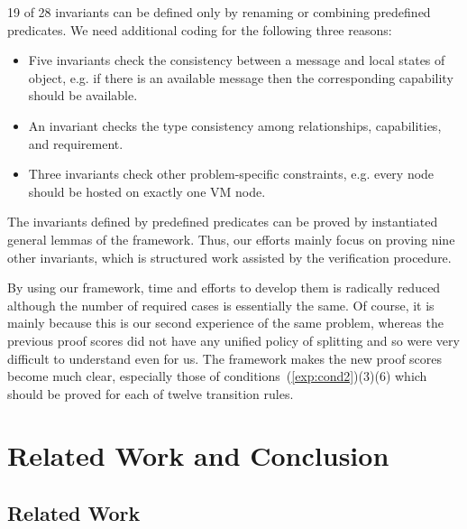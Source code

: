 \documentclass[12pt]{report}
\begin{document}
19 of 28 invariants can be defined only by renaming or combining
predefined predicates. We need additional coding for the following
three reasons:
\begin{itemize}
\item Five invariants check the consistency between a message and local
states of object, e.g. if there is an available message then the
corresponding capability should be available.
\item An invariant checks the type consistency among relationships,
  capabilities, and requirement.
\item Three invariants check other problem-specific constraints, e.g.
  every node should be hosted on exactly one VM node.
\end{itemize}

The invariants defined by predefined predicates can be proved by
instantiated general lemmas of the framework. Thus, our efforts mainly
focus on proving nine other invariants, which is structured work
assisted by the verification procedure.

By using our framework, time and efforts to develop them is radically
reduced although the number of required cases is essentially the same.
Of course, it is mainly because this is our second experience of the
same problem, whereas the previous proof scores did not have any
unified policy of splitting and so were very difficult to understand
even for us. The framework makes the new proof scores become much
clear, especially those of conditions~(\ref{exp:cond2})(3)(6) which should be proved
for each of twelve transition rules.


\chapter{Related Work and Conclusion}
\label{chap:conclusion}
\section{Related Work}
\end{document}
